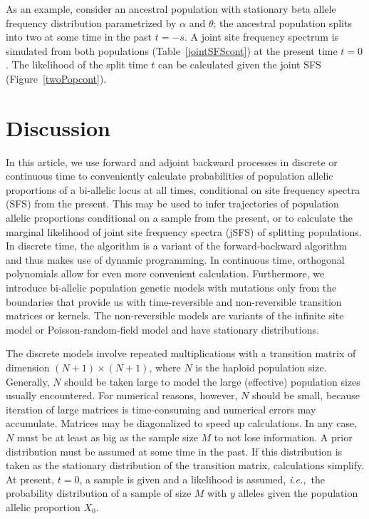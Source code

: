 \documentclass[preprint]{elsarticle}
\newcommand\ie{{\it i.e.,}}
\newcommand\x[1]{\ensuremath{X_{#1}}}
\begin{document}
As an example, consider an ancestral population with stationary beta allele frequency distribution parametrized by $\alpha$ and $\theta$; the ancestral population splits into two at some time in the past $t=-s$. A joint site frequency spectrum is simulated from both populations (Table~\ref{jointSFScont}) at the present time $t=0$. The likelihood of the split time $t$ can be calculated given the joint SFS (Figure~\ref{twoPopcont}). 

\section{Discussion}

In this article, we use forward and adjoint backward processes in discrete or continuous time to conveniently calculate probabilities of population allelic proportions of a bi-allelic locus at all times, conditional on site frequency spectra (SFS) from the present. This may be used to infer trajectories of population allelic proportions conditional on a sample from the present, or to calculate the marginal likelihood of joint site frequency spectra (jSFS) of splitting populations. In discrete time, the algorithm is a variant of the forward-backward algorithm and thus makes use of dynamic programming. In continuous time, orthogonal polynomials allow for even more convenient calculation. Furthermore, we introduce bi-allelic population genetic models with mutations only from the boundaries that provide us with time-reversible and non-reversible transition matrices or kernels. The non-reversible models are variants of the infinite site model \citep{Kimu69} or Poisson-random-field model \citep{Sawy92} and have stationary distributions.

The discrete models involve repeated multiplications with a transition matrix of dimension $(N+1)\times(N+1)$, where $N$ is the haploid population size. Generally, $N$ should be taken large to model the large (effective) population sizes usually encountered. For numerical reasons, however, $N$ should be small, because iteration of large matrices is time-consuming and numerical errors may accumulate. Matrices may be diagonalized to speed up calculations. In any case, $N$ must be at least as big as the sample size $M$ to not lose information. A prior distribution must be assumed at some time in the past. If this distribution is taken as the stationary distribution of the transition matrix, calculations simplify. At present, $t=0$, a sample is given and a likelihood is assumed, \ie\ the probability distribution of a sample of size $M$ with $y$ alleles given the population allelic proportion $\x{0}$.
\end{document}
